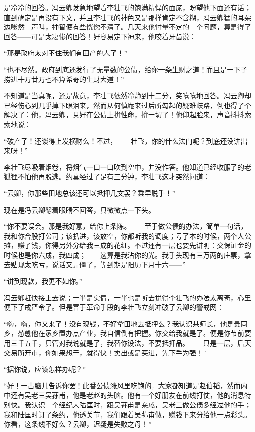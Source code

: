 \par 是冷冷的回答。冯云卿发急地望着李壮飞的饱满精悍的面庞，盼望他下面还有话；直到确定是再没有下文，并且李壮飞的神色又是那样肯定不含糊，冯云卿猛的耳朵边嗡然一声叫，神智便有些恍惚不清了。几天来他忖量不定的一个问题，算是得了回答——可是太凄惨的回答！好容易定下神来，他咬着牙齿说：
\par “那是政府太对不住我们有田产的人了！”
\par “也不尽然。政府到底还发行了无量数的公债，给你一条生财之道！而且是一下子捞进十万廿万也不算希奇的生财大道！”
\par 不知道是当真呢，还是故意，李壮飞依然冷静到十二分，笑嘻嘻地回答。冯云卿却已经伤心到几乎掉下眼泪来，然而从何慎庵来过后所勾起的疑难歧路，倒也得了个解决了：他，冯云卿，只好在公债上拚性命，拚一切了！他仰起脸来，声音抖抖索索地说：
\par “破产了！还谈得上发横财么！不过，——壮飞，你的什么法门呢？到底还没讲出来呀！”
\par 李壮飞尽吸着烟卷，将烟气一口一口吹到空中，并没作答。他知道已经收服了的老狐狸不怕他再脱逃。约莫经过了足有三分钟，李壮飞这才突然问道：
\par “云卿，你那些田地总该还可以抵押几文罢？乘早脱手！”
\par 现在是冯云卿翻着眼睛不回答，只微微点一下头。
\par “你不要误会。那是我好意，给你上条陈。——至于做公债的办法，简单一句话，我和你合股打公司；该扒进，该放空，你都听我的调度；亏了本的时候，两个人公摊，赚了钱，你得另外分给我三成的花红。不过还有一层也要先讲明：交保证金的时候也是你六成，我四成；——这算是我沾你的光。我手头现有三万两的庄票，拿去贴现太吃亏，说话又弄僵了，等到期是阳历下月十六——”
\par “讲到现款，我更不如你。”
\par 冯云卿赶快接上去说；一半是实情，一半也是听去觉得李壮飞的办法太离奇，心里便下了戒严令了。但是富于革命手段的李壮飞立刻冲破了云卿的警戒网：
\par “嗨，嗨，你又来了！没有现钱，不好拿田地去抵押么？我认识某师长，他是贵同乡，怂恿他在家乡置办点产业，我自信倒有把握。你交给我就是了。便是你节前要用三千五千，只管对我说就是了，我替你设法，不要抵押品。——只是一层，后天交易所开市，你如果想干，就得快！卖出或是买进，先下手为强！”
\par “据你说，应该怎样办呢？”
\par “好！一古脑儿告诉你罢！此番公债涨风里吃饱的，大家都知道是赵伯韬，然而内中还有吴老三吴荪甫，他是老赵的头脑。他有一个好朋友在前线打仗，他的消息特别快。我认识一个经纪人陆匡时，跟吴荪甫是亲戚，吴老三做公债多经过他的手；我和陆匡时订了条约，他透关节，我们跟着吴荪甫做，赚钱下来分给他一点彩头。你看，这条线不好么？云卿，迟疑是失败之母！”
